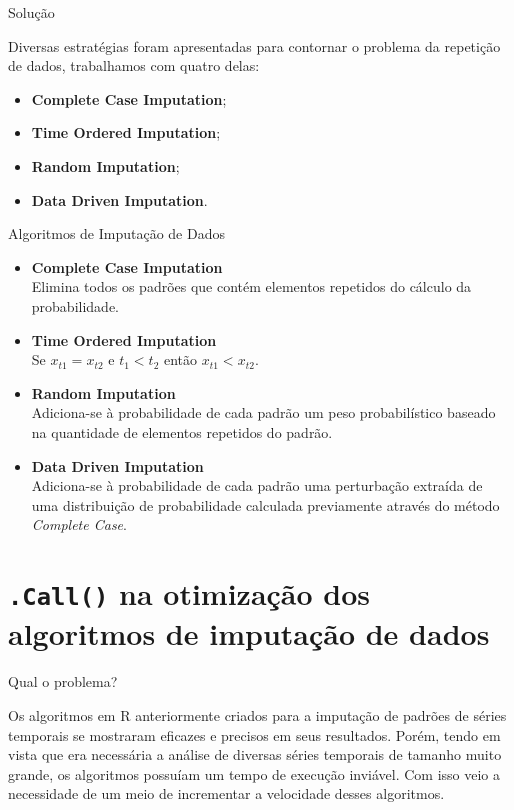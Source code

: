 \documentclass{beamer}
\begin{document}
\begin{frame}{Solução}

Diversas estratégias foram apresentadas para contornar o problema da repetição de dados, trabalhamos com quatro delas:

\begin{itemize}
    \item \textbf{Complete Case Imputation};
    \item \textbf{Time Ordered Imputation};
    \item \textbf{Random Imputation};
    \item \textbf{Data Driven Imputation}.~\cite{traversaro2018bandt}
\end{itemize}

\end{frame}

\begin{frame}{Algoritmos de Imputação de Dados}

\begin{itemize}
    \item \textbf{Complete Case Imputation}\\
    Elimina todos os padrões que contém elementos repetidos do cálculo da probabilidade.
    \item \textbf{Time Ordered Imputation}\\
    Se $x_{t1} = x_{t2}$ e $t_{1} < t_{2}$ então $x_{t1} < x_{t2}$.
    \item \textbf{Random Imputation}\\
    Adiciona-se à probabilidade de cada padrão um peso probabilístico baseado na quantidade de elementos repetidos do padrão.
    \item \textbf{Data Driven Imputation}\\
    Adiciona-se à probabilidade de cada padrão uma perturbação extraída de uma distribuição de probabilidade calculada previamente através do método \textit{Complete Case}.
\end{itemize}
    
\end{frame}

\section{\texttt{.Call()} na otimização dos algoritmos de imputação de dados}

\begin{frame}{Qual o problema?}

Os algoritmos em R anteriormente criados para a imputação de padrões de séries temporais se mostraram eficazes e precisos em seus resultados. Porém, tendo em vista que era necessária a análise de diversas séries temporais de tamanho muito grande, os algoritmos possuíam um tempo de execução inviável. Com isso veio a necessidade de um meio de incrementar a velocidade desses algoritmos.
    
\end{frame}
\end{document}
